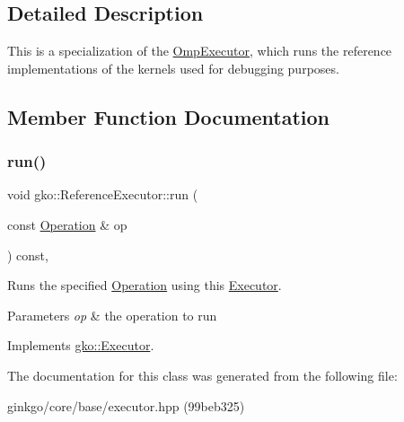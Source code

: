 \subsection{Detailed Description}
This is a specialization of the \hyperlink{classgko_1_1OmpExecutor}{Omp\+Executor}, which runs the reference implementations of the kernels used for debugging purposes. 

\subsection{Member Function Documentation}
\mbox{\label{classgko_1_1ReferenceExecutor_a82b41b42dbd26e8ac5b0146de79e5d34}} 
\subsubsection{\texorpdfstring{run()}{run()}}
{\footnotesize\ttfamily void gko\+::\+Reference\+Executor\+::run (\begin{DoxyParamCaption}\item[{const \hyperlink{classgko_1_1Operation}{Operation} \&}]{op }\end{DoxyParamCaption}) const\hspace{0.3cm}{\ttfamily [override]}, {\ttfamily [virtual]}}



Runs the specified \hyperlink{classgko_1_1Operation}{Operation} using this \hyperlink{classgko_1_1Executor}{Executor}. 


\begin{DoxyParams}{Parameters}
{\em op} & the operation to run \\
\hline
\end{DoxyParams}


Implements \hyperlink{classgko_1_1Executor_a1de8e2668b76e66690acf5eef9e8324d}{gko\+::\+Executor}.



The documentation for this class was generated from the following file\+:\begin{DoxyCompactItemize}
\item 
ginkgo/core/base/executor.\+hpp (99beb325)\end{DoxyCompactItemize}
